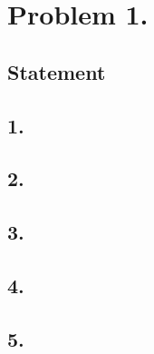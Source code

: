 \section{Problem 1.}
\subsection{Statement}

\subsection{1.}
\subsection{2.}
\subsection{3.}
\subsection{4.}
\subsection{5.}


